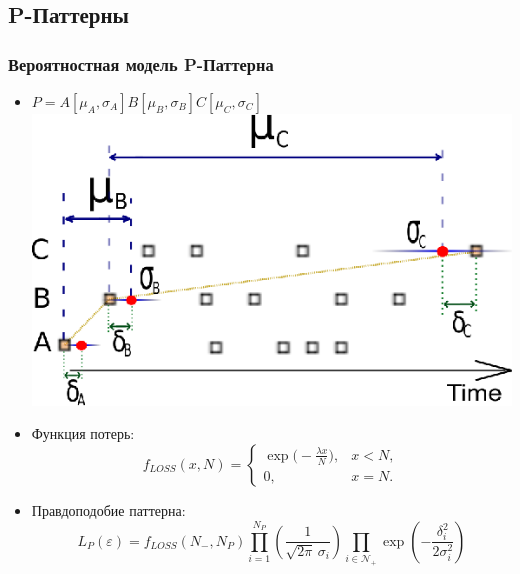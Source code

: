 \documentclass[smaller]{beamer}
\begin{document}
\subsection{P-Паттерны}
\begin{frame}
\frametitle{Вероятностная модель P-Паттерна}
 \begin{itemize}
  \item $P=A[\mu_A,\sigma_A]B[\mu_B,\sigma_B]C[\mu_C,\sigma_C]$\\
 \includegraphics[scale=0.6]{il1.eps} \\
  \item Функция потерь:
        $$
  f_{LOSS}(x,N)= \begin{cases}
   \exp\bigl(-\frac{\lambda x}{N}\bigr), & x < N, \\
   0,                                    & x=N.
   \end{cases}
  $$
  \item Правдоподобие паттерна:
$$L_{P}(\varepsilon)=
f_{LOSS}(N_-,N_{P})
\prod_{i=1}^{N_{P}}\left( \frac1{\sqrt{2\pi}\,\sigma_i }\right) 
\prod_{i\in \mathcal{N}_+}\exp\left(- \frac{\delta_i^2}{2\sigma_i^2}\right) 
$$
 \end{itemize}
\end{frame}  
\end{document}

